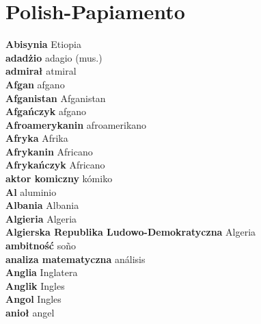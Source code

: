 \twocolumn
\chapter{Polish-Papiamento}
\small
{}\textbf{ Abisynia  } Etiopia \\
\textbf{ adadżio  } adagio (mus.) \\
\textbf{ admirał  } atmiral \\
\textbf{ Afgan  } afgano \\
\textbf{ Afganistan  } Afganistan \\
\textbf{ Afgańczyk  } afgano \\
\textbf{ Afroamerykanin  } afroamerikano \\
\textbf{ Afryka  } Afrika \\
\textbf{ Afrykanin  } Africano \\
\textbf{ Afrykańczyk  } Africano \\
\textbf{ aktor komiczny  } kómiko \\
\textbf{ Al  } aluminio \\
\textbf{ Albania  } Albania \\
\textbf{ Algieria  } Algeria \\
\textbf{ Algierska Republika Ludowo-Demokratyczna  } Algeria \\
\textbf{ ambitność  } soño \\
\textbf{ analiza matematyczna  } análisis \\
\textbf{ Anglia  } Inglatera \\
\textbf{ Anglik  } Ingles \\
\textbf{ Angol  } Ingles \\
\textbf{ anioł  } angel \\
